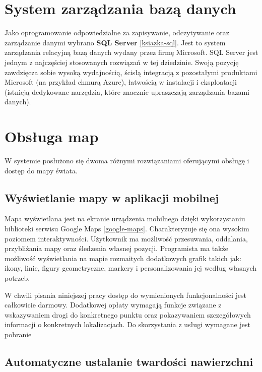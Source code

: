 \section{System zarządzania bazą danych}
Jako oprogramowanie odpowiedzialne za zapisywanie, odczytywanie oraz zarządzanie danymi wybrano \textbf{SQL Server} \ref{ksiazka-sql}. Jest to system zarządzania relacyjną bazą danych wydany przez firmę Microsoft. SQL Server jest jednym z najczęściej stosowanych rozwiązań w tej dziedzinie. Swoją pozycję zawdzięcza sobie wysoką wydajnością, ścisłą integracją z pozostałymi produktami Microsoft (na przykład chmurą Azure), łatwością w instalacji i eksploatacji (istnieją dedykowane narzędzia, które znacznie upraszczają zarządzania bazami danych).

\section{Obsługa map}
W systemie posłużono się dwoma różnymi rozwiązaniami oferującymi obsługę i dostęp do mapy świata.
\subsection{Wyświetlanie mapy w aplikacji mobilnej}
Mapa wyświetlana jest na ekranie urządzenia mobilnego dzięki wykorzystaniu biblioteki serwisu Google Maps \ref{google-maps}. Charakteryzuje się ona wysokim poziomem interaktywności. Użytkownik ma możliwość przesuwania, oddalania, przybliżania mapy oraz śledzenia własnej pozycji. Programista ma także możliwość wyświetlania na mapie rozmaitych dodatkowych grafik takich jak: ikony, linie, figury geometryczne, markery i personalizowania jej według własnych potrzeb.

W chwili pisania niniejszej pracy dostęp do wymienionych funkcjonalności jest całkowicie darmowy. Dodatkowej opłaty wymagają funkcje związane z wskazywaniem drogi do konkretnego punktu oraz pokazywaniem szczegółowych informacji o konkretnych lokalizacjach.
 Do skorzystania z usługi wymagane jest pobranie 
\subsection{Automatyczne ustalanie twardości nawierzchni}